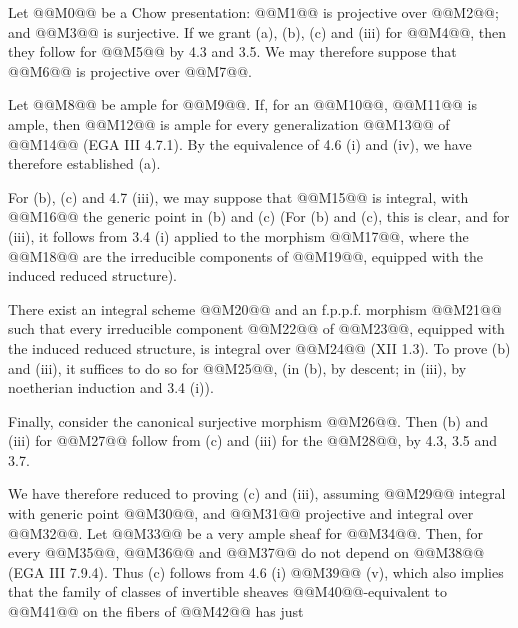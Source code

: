 Let @@M0@@ be a Chow presentation: @@M1@@ is projective over @@M2@@; and @@M3@@ is surjective. If we grant (a), (b), (c) and (iii) for @@M4@@, then they follow for @@M5@@ by 4.3 and 3.5. We may therefore suppose that @@M6@@ is projective over @@M7@@.

Let @@M8@@ be ample for @@M9@@. If, for an @@M10@@, @@M11@@ is ample, then @@M12@@ is ample for every generalization @@M13@@ of @@M14@@ (EGA III 4.7.1). By the equivalence of 4.6 (i) and (iv), we have therefore established (a).

For (b), (c) and 4.7 (iii), we may suppose that @@M15@@ is integral, with @@M16@@ the generic point in (b) and (c) (For (b) and (c), this is clear, and for (iii), it follows from 3.4 (i) applied to the morphism @@M17@@, where the @@M18@@ are the irreducible components of @@M19@@, equipped with the induced reduced structure).

There exist an integral scheme @@M20@@ and an f.p.p.f. morphism @@M21@@ such that every irreducible component @@M22@@ of @@M23@@, equipped with the induced reduced structure, is integral over @@M24@@ (XII 1.3). To prove (b) and (iii), it suffices to do so for @@M25@@, (in (b), by descent; in (iii), by noetherian induction and 3.4 (i)).

Finally, consider the canonical surjective morphism @@M26@@. Then (b) and (iii) for @@M27@@ follow from (c) and (iii) for the @@M28@@, by 4.3, 3.5 and 3.7.

We have therefore reduced to proving (c) and (iii), assuming @@M29@@ integral with generic point @@M30@@, and @@M31@@ projective and integral over @@M32@@. Let @@M33@@ be a very ample sheaf for @@M34@@. Then, for every @@M35@@, @@M36@@ and @@M37@@ do not depend on @@M38@@ (EGA III 7.9.4). Thus (c) follows from 4.6 (i) @@M39@@ (v), which also implies that the family of classes of invertible sheaves @@M40@@-equivalent to @@M41@@ on the fibers of @@M42@@ has just
